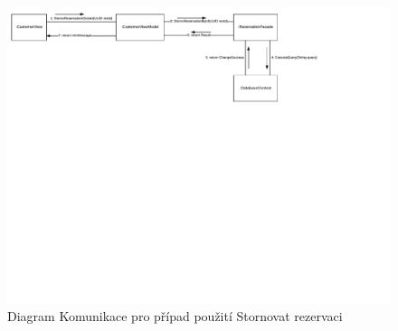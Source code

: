 \newpage
\begin{landscape}   
\end{landscape}

\newpage
\begin{figure}[h!]
\begin{center}
\includegraphics[scale=0.7]{../02_Vysledne_modely/09_1_CommunicationDiagram.pdf}
\vspace{150pt}
\caption{Diagram Komunikace pro případ použití Stornovat rezervaci}
\label{fig:communication09-1}
\end{center}
\end{figure}    

\newpage
\begin{landscape}   
\end{landscape}

